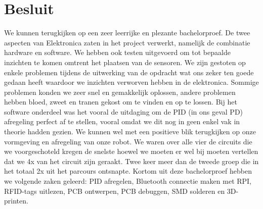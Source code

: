 \chapter{Besluit}
We kunnen terugkijken op een zeer leerrijke en plezante bachelorproef. De twee aspecten van Elektronica zaten in het project verwerkt, namelijk de combinatie hardware en software. We hebben ook testen uitgevoerd  om tot bepaalde inzichten te komen omtrent het plaatsen van de sensoren. We zijn gestoten op enkele problemen tijdens de uitwerking van de opdracht wat ons zeker ten goede gedaan heeft waardoor we inzichten verworven hebben in de elektronica. Sommige problemen konden we zeer snel en gemakkelijk oplossen, andere problemen hebben bloed, zweet en tranen gekost om te vinden en op te lossen. Bij het software onderdeel was het vooral de uitdaging om de PID (in ons geval PD) afregeling perfect af te stellen, vooral omdat we dit nog in geen enkel vak in theorie hadden gezien. We kunnen wel met een positieve blik terugkijken op onze vormgeving en afregeling van onze robot. We waren over alle vier de circuits die we voorgeschoteld kregen de snelste hoewel we moeten er wel bij moeten vertellen dat we 4x van het circuit zijn geraakt. Twee keer meer dan de tweede groep die in het totaal 2x uit het parcours ontsnapte. Kortom uit deze bachelorproef hebben we volgende zaken geleerd: PID afregelen, Bluetooth connectie maken met RPI, RFID-tags uitlezen, PCB ontwerpen, PCB debuggen, SMD solderen en 3D-printen. 
